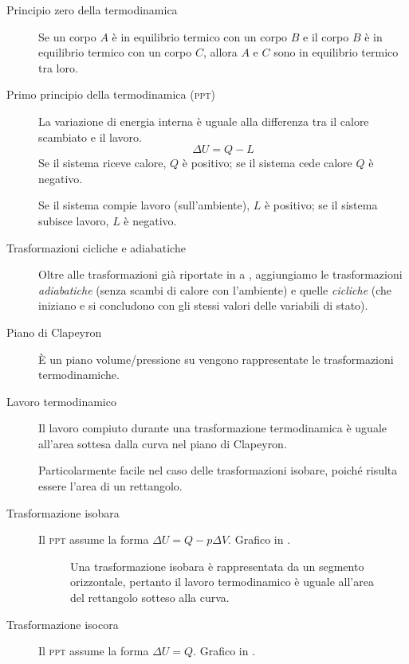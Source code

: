 \documentclass[a4paper,11pt,italian]{article}
\begin{document}
\begin{description}
  \item[Principio zero della termodinamica] 
  Se un corpo $ A $ è in equilibrio termico con un corpo $ B $ e il corpo $ B $ è in equilibrio termico con un corpo $ C $, allora $ A $ e $ C $ sono in equilibrio termico tra loro.
  
  \item[Primo principio della termodinamica (\textsc{ppt})] 
  La variazione di energia interna è uguale alla differenza tra il calore scambiato e il lavoro.
  \[ \Delta U = Q - L \]
  Se il sistema riceve calore, $ Q $ è positivo; se il sistema cede calore $ Q $ è negativo.
  
  Se il sistema compie lavoro (sull'ambiente), $ L $ è positivo; se il sistema subisce lavoro, $ L $ è negativo.
  
  \item[Trasformazioni cicliche e adiabatiche] 
  Oltre alle trasformazioni già riportate in  a , aggiungiamo le trasformazioni \emph{adiabatiche} (senza scambi di calore con l'ambiente) e quelle \emph{cicliche} (che iniziano e si concludono con gli stessi valori delle variabili di stato).
  
  \item[Piano di Clapeyron] 
  È un piano volume/pressione su vengono rappresentate le trasformazioni termodinamiche.
  
  \item[Lavoro termodinamico] 
  Il lavoro compiuto durante una trasformazione termodinamica è uguale all'area sottesa dalla curva nel piano di Clapeyron.
  
  Particolarmente facile nel caso delle trasformazioni isobare, poiché risulta essere l'area di un rettangolo.
  
  \item[Trasformazione isobara] 
  Il \textsc{ppt} assume la forma $ \Delta U = Q - p \Delta V $. Grafico in .
  
\begin{figure}[htp]\centering

\caption{Una trasformazione isobara è rappresentata da un segmento orizzontale, pertanto il lavoro termodinamico è uguale all'area del rettangolo sotteso alla curva.}
\label{img:isobara}
\end{figure}
  
  \item[Trasformazione isocora] 
  Il \textsc{ppt} assume la forma $ \Delta U = Q $. Grafico in .


\end{description}
\end{document}
